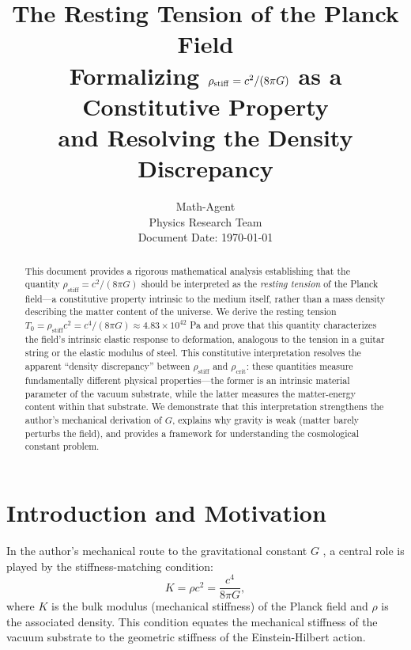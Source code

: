 \documentclass[11pt,a4paper]{article}
\title{\textbf{The Resting Tension of the Planck Field}\\[0.5em]
\large Formalizing $\rhostiff = c^2/(8\pi G)$ as a Constitutive Property\\[0.3em]
and Resolving the Density Discrepancy}
\author{Math-Agent\\
\small Physics Research Team\\
\small Document Date: \today}
\date{}
\newcommand{\rhocrit}{\ensuremath{\rho_{\mathrm{crit}}}}
\newcommand{\rhostiff}{\ensuremath{\rho_{\mathrm{stiff}}}}
\newcommand{\Tzero}{\ensuremath{T_0}}
\theoremstyle{definition}
\begin{document}
\maketitle

\begin{abstract}
This document provides a rigorous mathematical analysis establishing that the quantity $\rhostiff = c^2/(8\pi G)$ should be interpreted as the \emph{resting tension} of the Planck field---a constitutive property intrinsic to the medium itself, rather than a mass density describing the matter content of the universe. We derive the resting tension $\Tzero = \rhostiff c^2 = c^4/(8\pi G) \approx 4.83 \times 10^{42}$ Pa and prove that this quantity characterizes the field's intrinsic elastic response to deformation, analogous to the tension in a guitar string or the elastic modulus of steel. This constitutive interpretation resolves the apparent ``density discrepancy'' between $\rhostiff$ and $\rhocrit$: these quantities measure fundamentally different physical properties---the former is an intrinsic material parameter of the vacuum substrate, while the latter measures the matter-energy content within that substrate. We demonstrate that this interpretation strengthens the author's mechanical derivation of $G$, explains why gravity is weak (matter barely perturbs the field), and provides a framework for understanding the cosmological constant problem.
\end{abstract}

\tableofcontents
\newpage

\section{Introduction and Motivation}
\label{sec:introduction}

In the author's mechanical route to the gravitational constant $G$ \cite{SkavbergMechG2025}, a central role is played by the stiffness-matching condition:
\begin{equation}
\label{eq:stiffness_intro}
K = \rho c^2 = \frac{c^4}{8\pi G},
\end{equation}
where $K$ is the bulk modulus (mechanical stiffness) of the Planck field and $\rho$ is the associated density. This condition equates the mechanical stiffness of the vacuum substrate to the geometric stiffness of the Einstein-Hilbert action.
\end{document}
